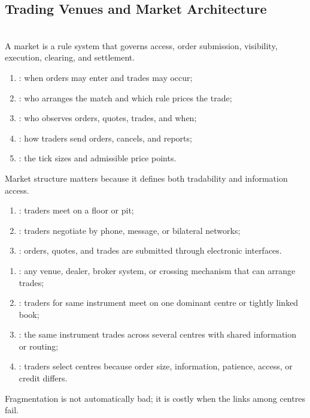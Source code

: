\subsection{Trading Venues and Market Architecture}

\begin{principle} \\
A market is a rule system that governs access, order submission, visibility, execution, clearing, and settlement.
\end{principle}

\begin{taxonomy} 
\begin{enumerate}[label=\roman*.]
\setlength{\itemsep}{0pt}
\item {}: when orders may enter and trades may occur;
\item {}: who arranges the match and which rule prices the trade;
\item {}: who observes orders, quotes, trades, and when;
\item {}: how traders send orders, cancels, and reports;
\item {}: the tick sizes and admissible price points.
\end{enumerate}
Market structure matters because it defines both tradability and information access.
\end{taxonomy}

\begin{taxonomy} 
\begin{enumerate}[label=\roman*.]
\setlength{\itemsep}{0pt}
\item {}: traders meet on a floor or pit;
\item {}: traders negotiate by phone, message, or bilateral networks;
\item {}: orders, quotes, and trades are submitted through electronic interfaces.
\end{enumerate}
\end{taxonomy}

\begin{taxonomy} 
\begin{enumerate}[label=\roman*.]
\setlength{\itemsep}{0pt}
\item {}: any venue, dealer, broker system, or crossing mechanism that can arrange trades;
\item {}: traders for same instrument meet on one dominant centre or tightly linked book;
\item {}: the same instrument trades across several centres with shared information or routing;
\item {}: traders select centres because order size, information, patience, access, or credit differs.
\end{enumerate}
Fragmentation is not automatically bad; it is costly when the links among centres fail.
\end{taxonomy}

